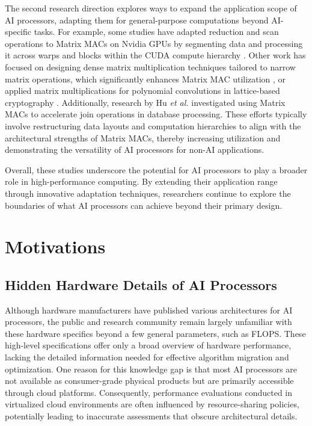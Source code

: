 The second research direction explores ways to expand the application scope of AI processors, adapting them for general-purpose computations beyond AI-specific tasks. For example, some studies have adapted reduction and scan operations to Matrix MACs on Nvidia GPUs by segmenting data and processing it across warps and blocks within the CUDA compute hierarchy \cite{DBLP:conf/sccc/CarrascoVN18, DBLP:conf/ics/DakkakLXGH19}. Other work has focused on designing dense matrix multiplication techniques tailored to narrow matrix operations, which significantly enhances Matrix MAC utilization \cite{DBLP:conf/ic-nc/TangK0K20}, or applied matrix multiplications for polynomial convolutions in lattice-based cryptography \cite{DBLP:journals/access/LeeSZH22}. Additionally, research by Hu \textit{et al.} \cite{10.1145/3514221.3517869} investigated using Matrix MACs to accelerate join operations in database processing. These efforts typically involve restructuring data layouts and computation hierarchies to align with the architectural strengths of Matrix MACs, thereby increasing utilization and demonstrating the versatility of AI processors for non-AI applications.

Overall, these studies underscore the potential for AI processors to play a broader role in high-performance computing. By extending their application range through innovative adaptation techniques, researchers continue to explore the boundaries of what AI processors can achieve beyond their primary design.

\section{Motivations}
\label{sec_1_2_motivations}

\subsection{Hidden Hardware Details of AI Processors}

Although hardware manufacturers have published various architectures for AI processors, the public and research community remain largely unfamiliar with these hardware specifics beyond a few general parameters, such as FLOPS. These high-level specifications offer only a broad overview of hardware performance, lacking the detailed information needed for effective algorithm migration and optimization. One reason for this knowledge gap is that most AI processors are not available as consumer-grade physical products but are primarily accessible through cloud platforms. Consequently, performance evaluations conducted in virtualized cloud environments are often influenced by resource-sharing policies, potentially leading to inaccurate assessments that obscure architectural details.

